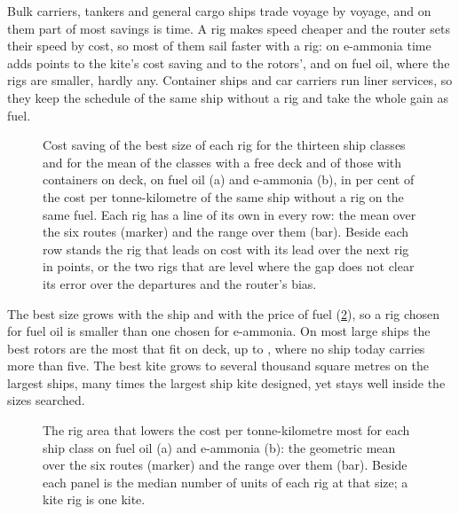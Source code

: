 \documentclass[10pt,a4paper]{article}
\begin{document}
Bulk carriers, tankers and general cargo ships trade voyage by voyage, and on them part of most savings is time. A rig makes speed cheaper and the router sets their speed by cost, so most of them sail faster with a rig: on e-ammonia time adds \NumSplitTimeAmmoniaKite{} points to the kite's cost saving and \NumSplitTimeAmmoniaRotors{} to the rotors', and on fuel oil, where the rigs are smaller, hardly any. Container ships and car carriers run liner services, so they keep the schedule of the same ship without a rig and take the whole gain as fuel. 

\begin{figure}[!htb]
\centering
{}
\caption{Cost saving of the best size of each rig for the thirteen ship classes and for the mean of the classes with a free deck and of those with containers on deck, on fuel oil (a) and e-ammonia (b), in per cent of the cost per tonne-kilometre of the same ship without a rig on the same fuel. Each rig has a line of its own in every row: the mean over the six routes (marker) and the range over them (bar). Beside each row stands the rig that leads on cost with its lead over the next rig in points, or the two rigs that are level where the gap does not clear its error over the departures and the router's bias.}
\label{ea:class_comparison}
\end{figure}

The best size grows with the ship and with the price of fuel (\cref{ea:class_sizes}), so a rig chosen for fuel oil is smaller than one chosen for e-ammonia. On most large ships the best rotors are the most that fit on deck, up to \NumMostUnitsRotors{}, where no ship today carries more than five. The best kite grows to several thousand square metres on the largest ships, many times the largest ship kite designed, yet stays well inside the sizes searched.

\begin{figure}[!htb]
\centering
{}
\caption{The rig area that lowers the cost per tonne-kilometre most for each ship class on fuel oil (a) and e-ammonia (b): the geometric mean over the six routes (marker) and the range over them (bar). Beside each panel is the median number of units of each rig at that size; a kite rig is one kite.}
\label{ea:class_sizes}
\end{figure}
\end{document}
